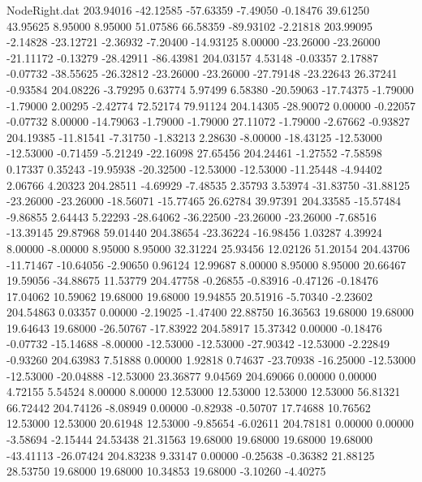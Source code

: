 \begin{filecontents}{NodeRight.dat}
 203.94016  -42.12585  -57.63359    -7.49050   -0.18476   39.61250   43.95625    8.95000    8.95000   51.07586   66.58359  -89.93102   -2.21818
 203.99095   -2.14828  -23.12721    -2.36932   -7.20400  -14.93125    8.00000  -23.26000  -23.26000  -21.11172   -0.13279  -28.42911  -86.43981
 204.03157    4.53148   -0.03357     2.17887   -0.07732  -38.55625  -26.32812  -23.26000  -23.26000  -27.79148  -23.22643   26.37241   -0.93584
 204.08226   -3.79295    0.63774     5.97499    6.58380  -20.59063  -17.74375   -1.79000   -1.79000    2.00295   -2.42774   72.52174   79.91124
 204.14305  -28.90072    0.00000    -0.22057   -0.07732    8.00000  -14.79063   -1.79000   -1.79000   27.11072   -1.79000   -2.67662   -0.93827
 204.19385  -11.81541   -7.31750    -1.83213    2.28630   -8.00000  -18.43125  -12.53000  -12.53000   -0.71459   -5.21249  -22.16098   27.65456
 204.24461   -1.27552   -7.58598     0.17337    0.35243  -19.95938  -20.32500  -12.53000  -12.53000  -11.25448   -4.94402    2.06766    4.20323
 204.28511   -4.69929   -7.48535     2.35793    3.53974  -31.83750  -31.88125  -23.26000  -23.26000  -18.56071  -15.77465   26.62784   39.97391
 204.33585  -15.57484   -9.86855     2.64443    5.22293  -28.64062  -36.22500  -23.26000  -23.26000   -7.68516  -13.39145   29.87968   59.01440
 204.38654  -23.36224  -16.98456     1.03287    4.39924    8.00000   -8.00000    8.95000    8.95000   32.31224   25.93456   12.02126   51.20154
 204.43706  -11.71467  -10.64056    -2.90650    0.96124   12.99687    8.00000    8.95000    8.95000   20.66467   19.59056  -34.88675   11.53779
 204.47758   -0.26855   -0.83916    -0.47126   -0.18476   17.04062   10.59062   19.68000   19.68000   19.94855   20.51916   -5.70340   -2.23602
 204.54863    0.03357    0.00000    -2.19025   -1.47400   22.88750   16.36563   19.68000   19.68000   19.64643   19.68000  -26.50767  -17.83922
 204.58917   15.37342    0.00000    -0.18476   -0.07732  -15.14688   -8.00000  -12.53000  -12.53000  -27.90342  -12.53000   -2.22849   -0.93260
 204.63983    7.51888    0.00000     1.92818    0.74637  -23.70938  -16.25000  -12.53000  -12.53000  -20.04888  -12.53000   23.36877    9.04569
 204.69066    0.00000    0.00000     4.72155    5.54524    8.00000    8.00000   12.53000   12.53000   12.53000   12.53000   56.81321   66.72442
 204.74126   -8.08949    0.00000    -0.82938   -0.50707   17.74688   10.76562   12.53000   12.53000   20.61948   12.53000   -9.85654   -6.02611
 204.78181    0.00000    0.00000    -3.58694   -2.15444   24.53438   21.31563   19.68000   19.68000   19.68000   19.68000  -43.41113  -26.07424
 204.83238    9.33147    0.00000    -0.25638   -0.36382   21.88125   28.53750   19.68000   19.68000   10.34853   19.68000   -3.10260   -4.40275

\end{filecontents}
